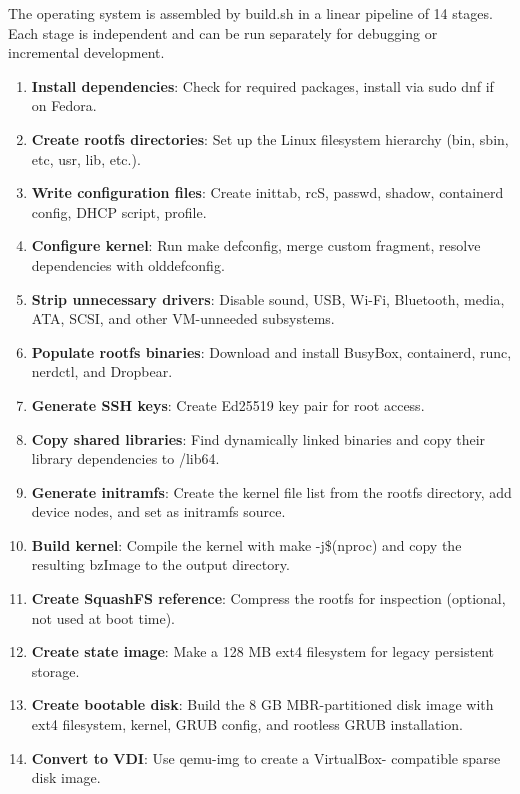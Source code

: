 The operating system is assembled by build.sh in a linear pipeline of
14 stages. Each stage is independent and can be run separately for
debugging or incremental development.

\begin{enumerate}[nosep]
  \item \textbf{Install dependencies}: Check for required packages, install
        via sudo dnf if on Fedora.
  \item \textbf{Create rootfs directories}: Set up the Linux filesystem
        hierarchy (bin, sbin, etc, usr, lib, etc.).
  \item \textbf{Write configuration files}: Create inittab, rcS, passwd,
        shadow, containerd config, DHCP script, profile.
  \item \textbf{Configure kernel}: Run make defconfig, merge custom fragment,
        resolve dependencies with olddefconfig.
  \item \textbf{Strip unnecessary drivers}: Disable sound, USB, Wi-Fi,
        Bluetooth, media, ATA, SCSI, and other VM-unneeded subsystems.
  \item \textbf{Populate rootfs binaries}: Download and install BusyBox,
        containerd, runc, nerdctl, and Dropbear.
  \item \textbf{Generate SSH keys}: Create Ed25519 key pair for root access.
  \item \textbf{Copy shared libraries}: Find dynamically linked binaries and
        copy their library dependencies to /lib64.
  \item \textbf{Generate initramfs}: Create the kernel file list from the
        rootfs directory, add device nodes, and set as initramfs source.
  \item \textbf{Build kernel}: Compile the kernel with make -j\$(nproc)
        and copy the resulting bzImage to the output directory.
  \item \textbf{Create SquashFS reference}: Compress the rootfs for
        inspection (optional, not used at boot time).
  \item \textbf{Create state image}: Make a 128 MB ext4 filesystem for
        legacy persistent storage.
  \item \textbf{Create bootable disk}: Build the 8 GB MBR-partitioned disk
        image with ext4 filesystem, kernel, GRUB config, and rootless
        GRUB installation.
  \item \textbf{Convert to VDI}: Use qemu-img to create a VirtualBox-
        compatible sparse disk image.
\end{enumerate}

